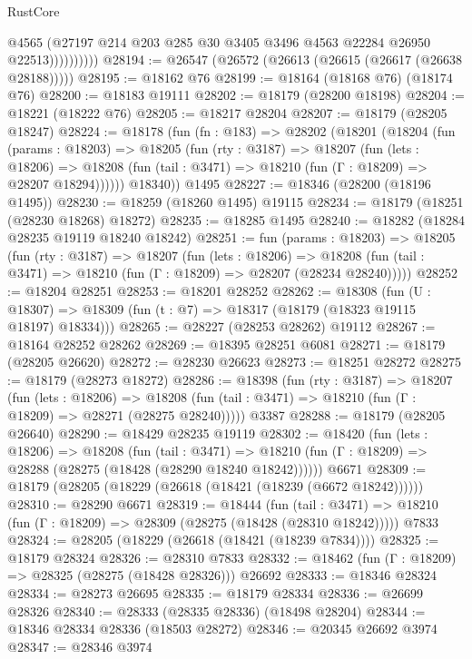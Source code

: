 \begin{lexlean}{RustCore}
\begin{coremodule}
                      @4565
                      (@27197 @214 @203 @285 @30 @3405 @3496 @4563 @22284 @26950 @22513))))))))))
@28194 := @26547 (@26572 (@26613 (@26615 (@26617 (@26638 @28188)))))
@28195 := @18162 @76
@28199 := @18164 (@18168 @76) (@18174 @76)
@28200 := @18183 @19111
@28202 := @18179 (@28200 @18198)
@28204 := @18221 (@18222 @76)
@28205 := @18217 @28204
@28207 := @18179 (@28205 @18247)
@28224 := @18178
    (fun (fn : @183) =>
    @28202
      (@18201
        (@18204
          (fun (params : @18203) =>
          @18205
            (fun (rty : @3187) =>
            @18207
              (fun (lets : @18206) =>
              @18208 (fun (tail : @3471) => @18210 (fun (Γ : @18209) => @28207 @18294))))))
        @18340))
    @1495
@28227 := @18346 (@28200 (@18196 @1495))
@28230 := @18259 (@18260 @1495) @19115
@28234 := @18179 (@18251 (@28230 @18268) @18272)
@28235 := @18285 @1495
@28240 := @18282 (@18284 @28235 @19119 @18240 @18242)
@28251 := fun (params : @18203) =>
  @18205
    (fun (rty : @3187) =>
    @18207
      (fun (lets : @18206) =>
      @18208 (fun (tail : @3471) => @18210 (fun (Γ : @18209) => @28207 (@28234 @28240)))))
@28252 := @18204 @28251
@28253 := @18201 @28252
@28262 := @18308
    (fun (U : @18307) => @18309 (fun (t : @7) => @18317 (@18179 (@18323 @19115 @18197) @18334)))
@28265 := @28227 (@28253 @28262) @19112
@28267 := @18164 @28252 @28262
@28269 := @18395 @28251 @6081
@28271 := @18179 (@28205 @26620)
@28272 := @28230 @26623
@28273 := @18251 @28272
@28275 := @18179 (@28273 @18272)
@28286 := @18398
    (fun (rty : @3187) =>
    @18207
      (fun (lets : @18206) =>
      @18208 (fun (tail : @3471) => @18210 (fun (Γ : @18209) => @28271 (@28275 @28240)))))
    @3387
@28288 := @18179 (@28205 @26640)
@28290 := @18429 @28235 @19119
@28302 := @18420
    (fun (lets : @18206) =>
    @18208
      (fun (tail : @3471) =>
      @18210 (fun (Γ : @18209) => @28288 (@28275 (@18428 (@28290 @18240 @18242))))))
    @6671
@28309 := @18179 (@28205 (@18229 (@26618 (@18421 (@18239 (@6672 @18242))))))
@28310 := @28290 @6671
@28319 := @18444
    (fun (tail : @3471) => @18210 (fun (Γ : @18209) => @28309 (@28275 (@18428 (@28310 @18242)))))
    @7833
@28324 := @28205 (@18229 (@26618 (@18421 (@18239 @7834))))
@28325 := @18179 @28324
@28326 := @28310 @7833
@28332 := @18462 (fun (Γ : @18209) => @28325 (@28275 (@18428 @28326))) @26692
@28333 := @18346 @28324
@28334 := @28273 @26695
@28335 := @18179 @28334
@28336 := @26699 @28326
@28340 := @28333 (@28335 @28336) (@18498 @28204)
@28344 := @18346 @28334 @28336 (@18503 @28272)
@28346 := @20345 @26692 @3974
@28347 := @28346 @3974

\end{coremodule}
\end{lexlean}
